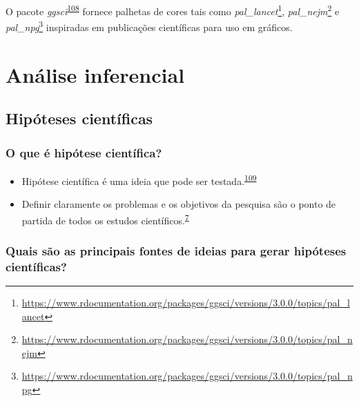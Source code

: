 \documentclass[
  a4paper,
]{book}
\renewcommand{\href}[2]{#2\footnote{\url{#1}}}
\newenvironment{infobox}[1]
  {
  \begin{itemize}
  \renewcommand{\labelitemi}{
    \raisebox{-.7\height}[0pt][0pt]{
      {\setkeys{Gin}{width=3em,keepaspectratio}
        \texttt{[image: \#1]}}
    }
  }
  \setlength{\fboxsep}{1em}
  \begin{blackbox}
  \item
  }
  {
  \end{blackbox}
  \end{itemize}
  }
\begin{document}
\begin{infobox}{images/Rlogo}
O pacote \emph{ggsci}\textsuperscript{\protect\hyperlink{ref-ggsci}{108}} fornece palhetas de cores tais como \href{https://www.rdocumentation.org/packages/ggsci/versions/3.0.0/topics/pal_lancet}{\emph{pal\_lancet}}, \href{https://www.rdocumentation.org/packages/ggsci/versions/3.0.0/topics/pal_nejm}{\emph{pal\_nejm}} e \href{https://www.rdocumentation.org/packages/ggsci/versions/3.0.0/topics/pal_npg}{\emph{pal\_npg}} inspiradas em publicações científicas para uso em gráficos.

\end{infobox}

\hypertarget{analise-inferencial}{%
\chapter{\texorpdfstring{\textbf{Análise inferencial}}{Análise inferencial}}\label{analise-inferencial}}

\hypertarget{ideias-hipoteses}{%
\section{Hipóteses científicas}\label{ideias-hipoteses}}

\hypertarget{o-que-uxe9-hipuxf3tese-cientuxedfica}{%
\subsection{O que é hipótese científica?}\label{o-que-uxe9-hipuxf3tese-cientuxedfica}}

\begin{itemize}
\item
  Hipótese científica é uma ideia que pode ser testada.\textsuperscript{\protect\hyperlink{ref-Curran-Everett2009}{109}}
\item
  Definir claramente os problemas e os objetivos da pesquisa são o ponto de partida de todos os estudos científicos.\textsuperscript{\protect\hyperlink{ref-van2022}{7}}
\end{itemize}

\hypertarget{quais-suxe3o-as-principais-fontes-de-ideias-para-gerar-hipuxf3teses-cientuxedficas}{%
\subsection{Quais são as principais fontes de ideias para gerar hipóteses científicas?}\label{quais-suxe3o-as-principais-fontes-de-ideias-para-gerar-hipuxf3teses-cientuxedficas}}
\end{document}
